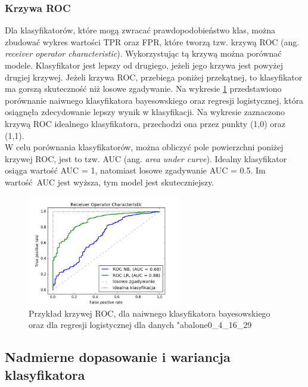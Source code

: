 \subsubsection{Krzywa ROC}
Dla klasyfikatorów, które mogą zwracać prawdopodobieństwo klas, można zbudować wykres wartości TPR oraz FPR, które tworzą tzw. krzywą ROC (ang. \textit{receiver operator characteristic}). Wykorzystując tą krzywą można porównać modele. Klasyfikator jest lepszy od drugiego, jeżeli jego krzywa jest powyżej drugiej krzywej. Jeżeli krzywa ROC, przebiega poniżej przekątnej, to klasyfikator ma gorszą skuteczność niż losowe zgadywanie. Na wykresie \ref{fig:krzywa_roc} przedstawiono porównanie naiwnego klasyfikatora bayesowskiego oraz regresji logistycznej, która osiągnęła zdecydowanie lepszy wynik w klasyfikacji. Na wykresie zaznaczono krzywą ROC idealnego klasyfikatora, przechodzi ona przez punkty (1,0) oraz (1,1).\\
W celu porównania klasyfikatorów, można obliczyć pole powierzchni poniżej krzywej ROC, jest to tzw. AUC (ang. \textit{area under curve}). Idealny klasyfikator osiąga wartość AUC = 1, natomiast losowe zgadywanie AUC = 0.5. Im wartość AUC jest wyższa, tym model jest skuteczniejszy.
\begin{figure}[h]
	\centering
	\includegraphics[width=0.6\textwidth]{./images/roc.png}
	\caption{Przykład krzywej ROC, dla naiwnego klasyfikatora bayesowskiego oraz dla regresji logistycznej dla danych "abalone0\_4\_16\_29}
	\label{fig:krzywa_roc}
\end{figure}

\subsection{Nadmierne dopasowanie i wariancja klasyfikatora}
 
